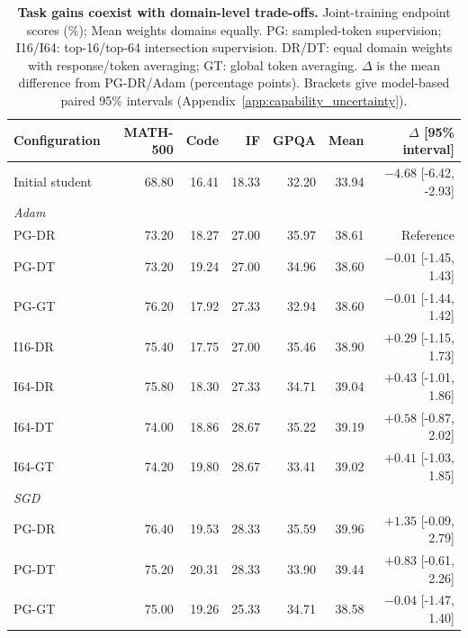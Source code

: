 \begin{table}[t]
\centering\small
\setlength{\tabcolsep}{3.5pt}
\caption{\textbf{Task gains coexist with domain-level trade-offs.} Joint-training endpoint scores (\%); Mean weights domains equally. PG: sampled-token supervision; I16/I64: top-16/top-64 intersection supervision. DR/DT: equal domain weights with response/token averaging; GT: global token averaging. $\Delta$ is the mean difference from PG-DR/Adam (percentage points). Brackets give model-based paired 95\% intervals (Appendix~\ref{app:capability_uncertainty}).}
\label{tab:completed_endpoints}
\begin{tabular}{lrrrrrr}
\toprule
Configuration & MATH-500 & Code & IF & GPQA & Mean & $\Delta$ [95\% interval] \\
\midrule
Initial student & 68.80 & 16.41 & 18.33 & 32.20 & 33.94 & $-4.68$ [-6.42, -2.93] \\
\midrule
\multicolumn{7}{l}{\textit{Adam}} \\
PG-DR & 73.20 & 18.27 & 27.00 & 35.97 & 38.61 & Reference \\
PG-DT & 73.20 & 19.24 & 27.00 & 34.96 & 38.60 & $-0.01$ [-1.45, 1.43] \\
PG-GT & 76.20 & 17.92 & 27.33 & 32.94 & 38.60 & $-0.01$ [-1.44, 1.42] \\
I16-DR & 75.40 & 17.75 & 27.00 & 35.46 & 38.90 & $+0.29$ [-1.15, 1.73] \\
I64-DR & 75.80 & 18.30 & 27.33 & 34.71 & 39.04 & $+0.43$ [-1.01, 1.86] \\
I64-DT & 74.00 & 18.86 & 28.67 & 35.22 & 39.19 & $+0.58$ [-0.87, 2.02] \\
I64-GT & 74.20 & 19.80 & 28.67 & 33.41 & 39.02 & $+0.41$ [-1.03, 1.85] \\
\midrule
\multicolumn{7}{l}{\textit{SGD}} \\
PG-DR & 76.40 & 19.53 & 28.33 & 35.59 & 39.96 & $+1.35$ [-0.09, 2.79] \\
PG-DT & 75.20 & 20.31 & 28.33 & 33.90 & 39.44 & $+0.83$ [-0.61, 2.26] \\
PG-GT & 75.00 & 19.26 & 25.33 & 34.71 & 38.58 & $-0.04$ [-1.47, 1.40] \\
\bottomrule
\end{tabular}
\par\vspace{2pt}
\end{table}
